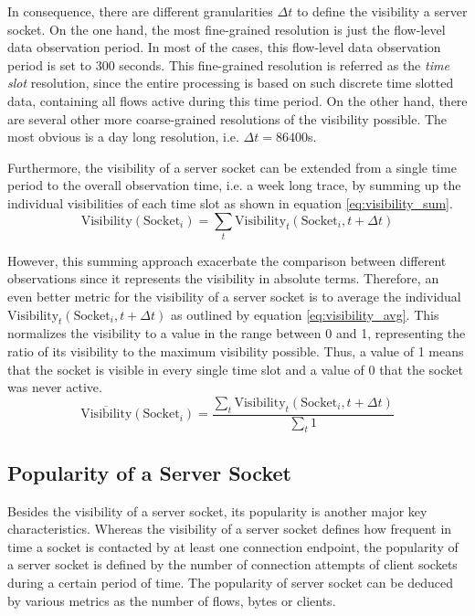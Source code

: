 In consequence, there are different granularities $\Delta{t}$ to define the visibility a server socket. On the one hand, the most fine-grained resolution is just the flow-level data observation period. In most of the cases, this flow-level data observation period is set to 300 seconds. This fine-grained resolution is referred as the \emph{time slot} resolution, since the entire processing is based on such discrete time slotted data, containing all flows active during this time period. 
On the other hand, there are several other more coarse-grained resolutions of the visibility possible. The most obvious is a day long resolution, i.e. $\Delta{t} = 86400$s.

Furthermore, the visibility of a server socket can be extended from a single time period to the overall observation time, i.e. a week long trace, by summing up the individual visibilities of each time slot as shown in equation \ref{eq:visibility_sum}.
\begin{equation}
	\text{Visibility}(\text{Socket}_i) = \sum_{t} \text{Visibility}_t(\text{Socket}_i,t+\Delta{t})
	\label{eq:visibility_sum} 
\end{equation}

However, this summing approach exacerbate the comparison between different observations since it represents the visibility in absolute terms. Therefore, an even better metric for the visibility of a server socket is to average the individual $\text{Visibility}_t(\text{Socket}_i,t+\Delta{t})$ as outlined by equation \ref{eq:visibility_avg}. This normalizes the visibility to a value in the range between 0 and 1, representing the ratio of its visibility to the maximum visibility possible. Thus, a value of 1 means that the socket is visible in every single time slot and a value of 0 that the socket was never active. 
\begin{equation}
	\overline{\text{Visibility}}(\text{Socket}_i) = \frac{\sum_{t} \text{Visibility}_t(\text{Socket}_i,t+\Delta{t})}{\sum_{t}1}
	\label{eq:visibility_avg} 
\end{equation}

\subsection{Popularity of a Server Socket}

Besides the visibility of a server socket, its popularity is another major key characteristics. Whereas the visibility of a server socket defines how frequent in time a socket is contacted by at least one connection endpoint, the popularity of a server socket is defined by the number of connection attempts of client sockets during a certain period of time. The popularity of server socket can be deduced by various metrics as the number of flows, bytes or clients.

